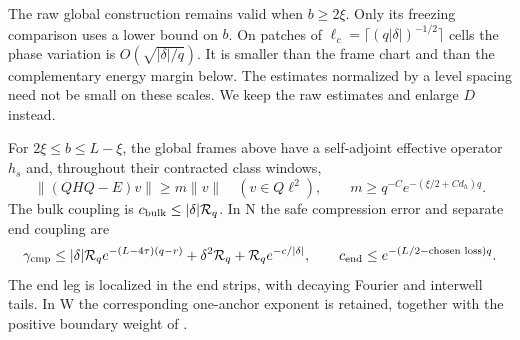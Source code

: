 The raw global construction remains valid when $b\ge2\xi$.
Only its freezing comparison uses a lower bound on $b$.
On patches of $\ell_c=\lceil(q|\delta|)^{-1/2}\rceil$ cells the phase
variation is $O(\sqrt{|\delta|/q})$. It is smaller than the frame
chart and than the complementary energy margin below.
The estimates normalized by a level spacing need not be small on
these scales. We keep the raw estimates and enlarge $D$ instead.

\begin{proposition}
\label{prop:libcompression}
For $2\xi\le b\le L-\xi$, the global frames above have a self-adjoint
effective operator $h_s$ and, throughout their contracted class
windows,
\begin{equation}\label{eq:libcompdata}
 \|(QHQ-E)v\|\ge m\|v\|\quad(v\in Q\ell^2),\qquad
 m\ge q^{-C}e^{-(\xi/2+Cd_h)q}.
\end{equation}
The bulk coupling is $c_{\rm bulk}\le|\delta|\mathcal R_q$.
In N the safe compression error and separate end coupling are
\begin{equation}\label{eq:libranktwoerrors}
 \gamma_{\rm cmp}\le |\delta|\mathcal R_q
       e^{-(L-4\tau)(q-r)}+\delta^2\mathcal R_q
       +\mathcal R_q e^{-c/|\delta|},\qquad
 c_{\rm end}\le e^{-(L/2-\text{chosen loss})q}.
\end{equation}
The end leg is localized in the end strips, with decaying Fourier
and interwell tails. In W the corresponding one-anchor exponent
is retained, together with the positive boundary weight of
\cite[Appendix D, Interior coupling and omitted translates]{DMband}.
\end{proposition}

